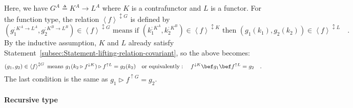 Here, we have $G^{A}\triangleq K^{A}\rightarrow L^{A}$ where $K$
is a contrafunctor and $L$ is a functor. For the function type, the
relation $\left<f\right>^{\updownarrow G}$ is defined by
\[
(g_{1}^{:K^{A}\rightarrow L^{A}},g_{2}^{:K^{B}\rightarrow L^{B}})\in\left<f\right>^{\updownarrow G}\text{ means if }(k_{1}^{:K^{A}},k_{2}^{:K^{B}})\in\left<f\right>^{\updownarrow K}\text{ then }(g_{1}(k_{1}),g_{2}(k_{2}))\in\left<f\right>^{\updownarrow L}\quad.
\]
By the inductive assumption, $K$ and $L$ already satisfy Statement~\ref{subsec:Statement-lifting-relation-covariant},
so the above becomes:
\[
(g_{1},g_{2})\in\left<f\right>^{\updownarrow G}\text{ means }g_{1}(k_{2}\triangleright f^{\downarrow K})\triangleright f^{\uparrow L}=g_{2}(k_{2})\quad\text{or equivalently}:\quad f^{\downarrow K}\bef g_{1}\bef f^{\uparrow L}=g_{2}\quad.
\]
The last condition is the same as $g_{1}\triangleright f^{\uparrow G}=g_{2}$.

\paragraph{Recursive type}

